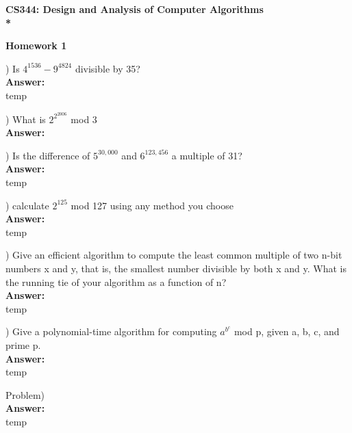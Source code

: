 \documentclass{article}
\begin{document}
\begin{center}
\bf{\LARGE CS344: Design and Analysis of Computer Algorithms} \\*

\vspace{0.2in}
{\bf {\Large Homework 1}}
\end{center}

\vspace{.2in}


\vspace{.2in}
) Is $4^{1536} - 9^{4824}$ divisible by 35? \\
\vspace{.1in}
{\bf Answer:} \\
\indent temp

\vspace{.3in}
) What is $2^{2^{2006}}$ mod 3 \\
\vspace{.1in}
{\bf Answer:} \\
\indent 

\vspace{.3in}
) Is the difference of $5^{30,000}$ and $6^{123,456}$ a multiple of 31? \\
\vspace{.1in}
{\bf Answer:} \\
\indent temp

\vspace{.3in}
) calculate $2^{125}$ mod 127 using any method you choose \\
\vspace{.1in}
{\bf Answer:} \\
\indent temp

\vspace{.3in}
) Give an efficient algorithm to compute the least common multiple of two 
\indent n-bit numbers x and y, that is, the smallest number divisible by both x and 
\indent y. What is the running tie of your algorithm as a function of n? \\
\vspace{.1in}
{\bf Answer:} \\
\indent temp

\vspace{.3in}
) Give a polynomial-time algorithm for computing $a^{b^c}$ mod p, given a, b, c, 
\indent and prime p. \\
\vspace{.1in}
{\bf Answer:} \\
\indent temp

\vspace{.3in}
\noindent Problem) \\
\vspace{.1in}
{\bf Answer:} \\
\indent temp
\end{document}
